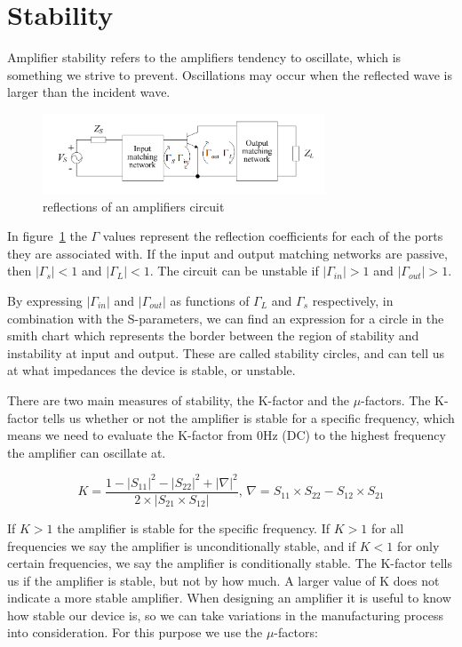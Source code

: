 \section{Stability}
Amplifier stability refers to the amplifiers tendency to oscillate, which is something we strive to prevent. Oscillations may occur when the reflected wave is larger than the incident wave.

\begin{figure}[H]
	  \centering
	  \includegraphics[width=0.75\textwidth]{img/Reflection_example}
	  \caption{reflections of an amplifiers circuit}
	  \label{fig:fig_reflection_ex}
\end{figure}

In figure~\ref{fig:fig_reflection_ex} the $\Gamma$ values represent the reflection coefficients for each of the ports they are associated with. If the input and output matching networks are passive, then $|\Gamma_s|<1$ and $|\Gamma_L|<1$. The circuit can be unstable if $|\Gamma_{in}|>1$ and $|\Gamma_{out}|>1$. 

By expressing $|\Gamma_{in}|$ and $|\Gamma_{out}|$ as functions of $\Gamma_L$  and $\Gamma_s$ respectively, in combination with the S-parameters, we can find an expression for a circle in the smith chart which represents the border between the region of stability and instability at input and output. These are called stability circles, and can tell us at what impedances the device is stable, or unstable.

There are two main measures of stability, the K-factor and the $\mu$-factors. The K-factor tells us whether or not the amplifier is stable for a specific frequency, which means we need to evaluate the K-factor from 0Hz (DC) to the highest frequency the amplifier can oscillate at.

\begin{equation}
K=\frac{1-|S_{11}|^2-|S_{22}|^2+|\nabla |^2}{2\times |S_{21}\times S_{12}|},\, \nabla =S_{11}\times S_{22}-S_{12}\times S_{21}
\end{equation}

If $K>1$ the amplifier is stable for the specific frequency. If $K>1$ for all frequencies we say the amplifier is unconditionally stable, and if $K<1$ for only certain frequencies, we say the amplifier is conditionally stable.  The K-factor tells us if the amplifier is stable, but not by how much. A larger value of K does not indicate a more stable amplifier. When designing an amplifier it is useful to know how stable our device is, so we can take variations in the manufacturing process into consideration. For this purpose we use the $\mu$-factors:

